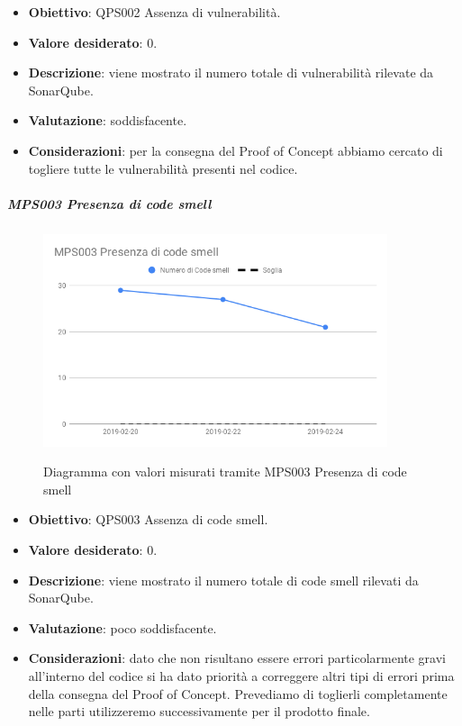     \begin{itemize}
        \item \textbf{Obiettivo}: QPS002 Assenza di vulnerabilità.
        \item \textbf{Valore desiderato}: 0.
        \item \textbf{Descrizione}: viene mostrato il numero totale di vulnerabilità rilevate da SonarQube.
        \item \textbf{Valutazione}: soddisfacente.
        \item \textbf{Considerazioni}: per la consegna del Proof of Concept abbiamo cercato di togliere tutte le vulnerabilità presenti nel codice.
    \end{itemize}

    \subparagraph{MPS003 Presenza di code smell}
    
    \begin{figure}[H]
        \centering
        \includegraphics[width=0.9\textwidth]{img/cruscotti/MPS003.png}
        \label{immaginePresenzaCodeSmell}
        \caption{Diagramma con valori misurati tramite MPS003 Presenza di code smell}
    \end{figure}
    
    \begin{itemize}
        \item \textbf{Obiettivo}: QPS003 Assenza di code smell.
        \item \textbf{Valore desiderato}: 0.
        \item \textbf{Descrizione}: viene mostrato il numero totale di code smell rilevati da SonarQube.
        \item \textbf{Valutazione}: poco soddisfacente.
        \item \textbf{Considerazioni}: dato che non risultano essere errori particolarmente gravi all'interno del codice si ha dato priorità a correggere altri tipi di errori prima della consegna del Proof of Concept. Prevediamo di toglierli completamente nelle parti utilizzeremo successivamente per il prodotto finale.
    \end{itemize}

